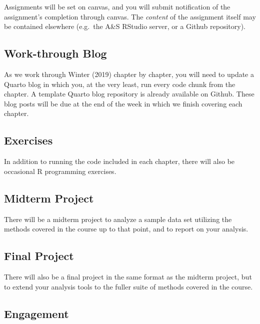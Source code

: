 \documentclass[
  letterpaper,
  DIV=11,
  numbers=noendperiod]{scrartcl}
\begin{document}
Assignments will be set on canvas, and you will submit notification of
the assignment's completion through canvas. The \emph{content} of the
assignment itself may be contained elsewhere (e.g.~the A\&S RStudio
server, or a Github repository).

\hypertarget{work-through-blog}{%
\subsection{Work-through Blog}\label{work-through-blog}}

As we work through Winter (2019) chapter by chapter, you will need to
update a Quarto blog in which you, at the very least, run every code
chunk from the chapter. A template Quarto blog repository is already
available on Github. These blog posts will be due at the end of the week
in which we finish covering each chapter.

\hypertarget{exercises}{%
\subsection{Exercises}\label{exercises}}

In addition to running the code included in each chapter, there will
also be occasional R programming exercises.

\hypertarget{midterm-project}{%
\subsection{Midterm Project}\label{midterm-project}}

There will be a midterm project to analyze a sample data set utilizing
the methods covered in the course up to that point, and to report on
your analysis.

\hypertarget{final-project}{%
\subsection{Final Project}\label{final-project}}

There will also be a final project in the same format as the midterm
project, but to extend your analysis tools to the fuller suite of
methods covered in the course.

\hypertarget{engagement}{%
\subsection{Engagement}\label{engagement}}
\end{document}
